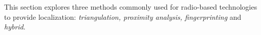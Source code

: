 This section explores three methods commonly used for radio-based technologies to provide localization: \textit{triangulation, proximity analysis, fingerprinting} and \textit{hybrid}.